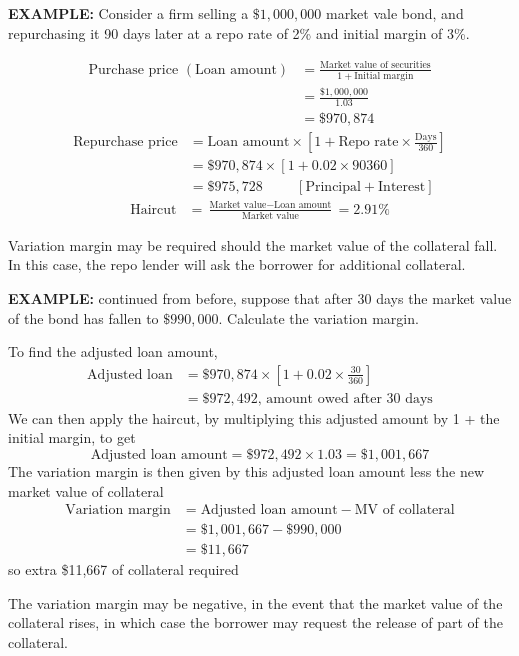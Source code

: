 \documentclass[../notes_compiled.tex]{subfiles}
\begin{document}
\begin{itemize}
{\color{RedViolet}
\item[] \textbf{EXAMPLE:} Consider a firm selling a $\$1,000,000$ market vale bond, and repurchasing it 90 days later at a repo rate of 2\% and initial margin of 3\%.
}
{\color{RoyalBlue}
\begin{align*}
\text{Purchase price } (\text{Loan amount}) &= \frac{\text{Market value of securities}}{1+\text{Initial margin}} \\
&=\frac{\$1,000,000}{1.03} \\
&=\$970,874
\end{align*}
\begin{align*}
\text{Repurchase price} &= \text{Loan amount} \times \left[ 1+\text{Repo rate}\times\frac{\text{Days}}{360}\right] \\
&=\$970,874 \times \left[ 1+0.02\times{90}{360}\right] \\
&=\$975,728 \hspace{1cm} \left[\text{Principal} + \text{Interest}\right]
\end{align*}
\begin{align*}
\text{Haircut} &= \frac{\text{Market value} - \text{Loan amount}}{\text{Market value}} = 2.91\%
\end{align*}
}
\item Variation margin may be required should the market value of the collateral fall. In this case, the repo lender will ask the borrower for additional collateral.
{\color{RedViolet}
\item[] \textbf{EXAMPLE:} continued from before, suppose that after 30 days the market value of the bond has fallen to $\$990,000$. Calculate the variation margin.
}
{\color{RoyalBlue}
\item[] To find the adjusted loan amount,
\begin{align*}
\text{Adjusted loan} &= \$970,874 \times \left[ 1+0.02\times\frac{30}{360}\right] \\
&= \$972,492\text{, amount owed after 30 days}
\end{align*}
We can then apply the haircut, by multiplying this adjusted amount by 1 + the initial margin, to get
\begin{equation*}
\text{Adjusted loan amount} = \$972,492 \times 1.03 = \$1,001,667
\end{equation*}
The variation margin is then given by this adjusted loan amount less the new market value of collateral
\begin{align*}
\text{Variation margin} &=\text{Adjusted loan amount} - \text{MV of collateral} \\
&=\$1,001,667 - \$990,000 \\
&=\$11,667
\end{align*}
so extra \$11,667 of collateral required
}
The variation margin may be negative, in the event that the market value of the collateral rises, in which case the borrower may request the release of part of the collateral.

\end{itemize}
\end{document}
